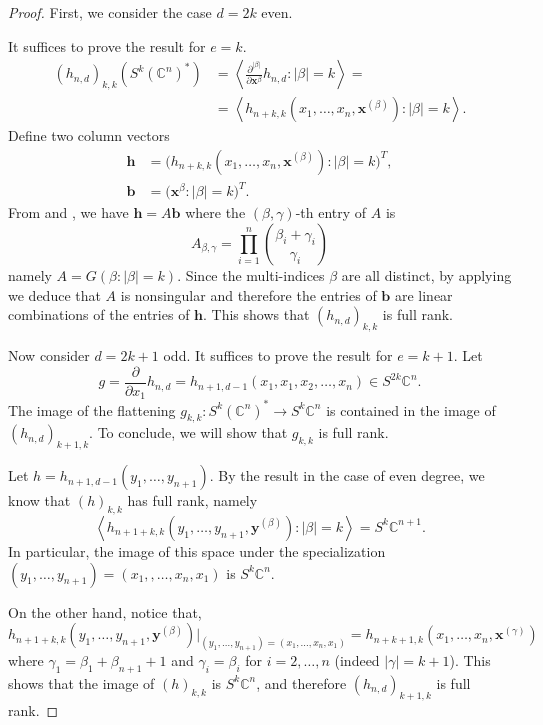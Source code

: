 \documentclass{toc}
\newcommand{\vvirg}{ , \dots , }
\newcommand{\textprod}{{\textstyle \prod}}
\newcommand{\bfb}{\mathbf{b}}
\newcommand{\bfh}{\mathbf{h}}
\newcommand{\bfx}{\mathbf{x}}
\newcommand{\bfy}{\mathbf{y}}
\newcommand{\bbC}{\mathbb{C}}
\begin{document}
\begin{proof}
First, we consider the case $d = 2k$ even.

It suffices to prove the result for $e = k$.
\begin{align*}
(h_{n,d})_{k,k} ( S^k (\bbC^n)^*) &= \left\langle \frac{\partial^{\vert \beta \vert}}{\partial \bfx^\beta}h_{n,d} : \vert \beta \vert =k\right\rangle = \\
  &= \left\langle h_{n+k,k}(x_1 \vvirg x_n, \bfx^{(\beta)}) : \vert \beta \vert = k \right\rangle.
\end{align*}
Define two column vectors
\begin{align*}
\bfh &= \bigl(h_{n+k,k}(x_1 \vvirg x_n, \bfx^{(\beta)}) :  \vert \beta \vert = k \bigr)^T, \\
\bfb &= \bigl(\bfx^\beta : \vert \beta \vert = k\bigr)^T.
\end{align*}
{}From  and , we have $\bfh = A \bfb$ where the $(\beta,\gamma)$-th entry of $A$ is 
\[
A_{\beta,\gamma} = \textprod_{i=1}^n\binom{\beta_i+\gamma_i}{\gamma_i}
\]
namely $A = G(\beta : \vert \beta \vert = k)$. Since the multi-indices $\beta$ are all distinct, by applying  we deduce that $A$ is nonsingular and therefore the entries of $\bfb$ are linear combinations of the entries of $\bfh$. This shows that $(h_{n,d})_{k,k}$ is full rank.

Now consider $d = 2k+1$ odd. It suffices to prove the result for $e = k+1$. Let
\[
  g = \frac{\partial}{\partial x_1}h_{n,d} = h_{n+1,d-1}(x_1,x_1,x_2 \vvirg x_n) \in S^{2k}\bbC^n.
\]
The image of the flattening $g_{k,k} : S^k (\bbC^n)^* \to S^k \bbC^n$
is contained in the image of $(h_{n,d})_{k+1,k}$.  To conclude, we
will show that $g_{k,k}$ is full rank.

Let $h = h_{n+1,d-1}(y_1 \vvirg y_{n+1})$. By the result in the case of even degree, we know that $(h)_{k,k}$ has full rank, namely 
\[
\left\langle h_{n+1+k,k}(y_1 \vvirg y_{n+1}, \bfy^{(\beta)}) : \vert \beta \vert = k\right\rangle = S^k \bbC^{n+1}.
\]
In particular, the image of this space under the specialization $(y_1 \vvirg y_{n+1}) = (x_1,\vvirg x_n,x_1)$ is $S^k \bbC^n$.

On the other hand, notice that,
\[
 h_{n+1+k,k}(y_1 \vvirg y_{n+1}, \bfy^{(\beta)})\vert_{(y_1 \vvirg y_{n+1}) = (x_1 \vvirg x_n,x_1)} = h_{n+k+1,k}(x_1 \vvirg x_n, \bfx^{(\gamma)})
\]
where $\gamma_1 = \beta_1 + \beta_{n+1} + 1$ and $\gamma_i = \beta_i$ for $i = 2 \vvirg n$ (indeed $\vert \gamma \vert = k+1$). This shows that the image of $(h)_{k,k}$ is $S^k \bbC^n$, and therefore $(h_{n,d})_{k+1,k}$ is full rank.
\end{proof}
 
\end{document}

